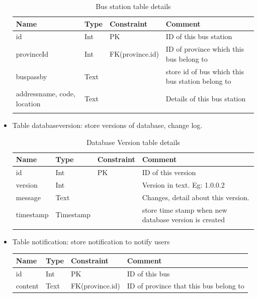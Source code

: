 \begin{itemize}
\begin{center}
\begin{longtable}{|p{4cm}|p{2cm}|p{3cm}|>{\raggedright\arraybackslash}p{5cm}|}
							\hline
							\bfseries Name & \bfseries Type & \bfseries Constraint & \bfseries Comment\\ [0.5ex] 
							\hline\hline
							id & Int & PK & ID of this bus station \\
							\hline
							provinceId & Int & FK(province.id) & ID of province which this bus belong to \\
							\hline
							buspassby & Text & & store id of bus which this bus station belong to \\
							\hline
							addressname, code, location & Text & & Details of this bus station \\
							\hline
							\caption{Bus station table details}	
							\label{table:busstation_table} 
						\end{longtable}
					\end{center}
				\item{Table databaseversion}: store versions of database, change log. 
					\begin{center}
						\begin{longtable}{|p{4cm}|p{2cm}|p{3cm}|>{\raggedright\arraybackslash}p{5cm}|} 
							\hline
							\bfseries Name & \bfseries Type & \bfseries Constraint & \bfseries Comment\\ [0.5ex] 
							\hline\hline
							id & Int & PK & ID of this version \\
							\hline
							version & Int & & Version in text. Eg: 1.0.0.2\\
							\hline
							message & Text & & Changes, detail about this version. \\
							\hline
							timestamp & Timestamp & & store time stamp when new database version is created \\
							\hline
							\caption{Database Version table details}	
							\label{table:databaseversion_table} 
						\end{longtable}
					\end{center}
				\item{Table notification}: store notification to notify users
					\begin{center}
						\begin{longtable}{|p{4cm}|p{2cm}|p{3cm}|>{\raggedright\arraybackslash}p{5cm}|} 
							\hline
							\bfseries Name & \bfseries Type & \bfseries Constraint & \bfseries Comment\\ [0.5ex] 
							\hline\hline
							id & Int & PK & ID of this bus \\
							\hline
							content & Text & FK(province.id) & ID of province that this bus belong to \\

\end{longtable}
\end{center}
\end{itemize}
